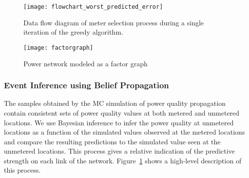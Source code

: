 \begin{figure}[t]
\centering
\texttt{[image: flowchart\_worst\_predicted\_error]}
\caption{Data flow diagram of meter selection process during a single iteration of the greedy algorithm.}
\label{flowchart}
\end{figure}

\begin{figure}[!t]
\centering
\texttt{[image: factorgraph]}
\caption{Power network modeled as a factor graph}
\label{factorgraph}
\end{figure}

\subsubsection{Event Inference using Belief Propagation}
The samples obtained by the MC simulation of power quality propagation contain consistent sets of power quality values at both metered and unmetered locations. We use Bayesian inference to infer the power quality at unmetered locations as a function of the  simulated values observed at the metered locations and compare the resulting predictions to the simulated value seen at the unmetered locations. This process gives a relative indication of the predictive strength on each link of the network. Figure~\ref{flowchart} shows a high-level description of this process.

